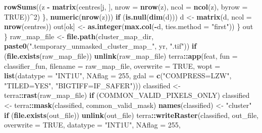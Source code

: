 \documentclass[
]{article}
\newenvironment{Shaded}{\begin{snugshade}}{\end{snugshade}}
\newcommand{\AttributeTok}[1]{\textcolor[rgb]{0.13,0.29,0.53}{#1}}
\newcommand{\ConstantTok}[1]{\textcolor[rgb]{0.56,0.35,0.01}{#1}}
\newcommand{\ControlFlowTok}[1]{\textcolor[rgb]{0.13,0.29,0.53}{\textbf{#1}}}
\newcommand{\DecValTok}[1]{\textcolor[rgb]{0.00,0.00,0.81}{#1}}
\newcommand{\FunctionTok}[1]{\textcolor[rgb]{0.13,0.29,0.53}{\textbf{#1}}}
\newcommand{\NormalTok}[1]{#1}
\newcommand{\OtherTok}[1]{\textcolor[rgb]{0.56,0.35,0.01}{#1}}
\newcommand{\SpecialCharTok}[1]{\textcolor[rgb]{0.81,0.36,0.00}{\textbf{#1}}}
\newcommand{\StringTok}[1]{\textcolor[rgb]{0.31,0.60,0.02}{#1}}
\begin{document}
\begin{Shaded}
\begin{Highlighting}[]
        \FunctionTok{rowSums}\NormalTok{((z }\SpecialCharTok{{-}} \FunctionTok{matrix}\NormalTok{(centres[j, ], }\AttributeTok{nrow =} \FunctionTok{nrow}\NormalTok{(z), }\AttributeTok{ncol =} \FunctionTok{ncol}\NormalTok{(z), }\AttributeTok{byrow =} \ConstantTok{TRUE}\NormalTok{))}\SpecialCharTok{\^{}}\DecValTok{2}\NormalTok{)}
\NormalTok{      \}, }\FunctionTok{numeric}\NormalTok{(}\FunctionTok{nrow}\NormalTok{(z)))}
      \ControlFlowTok{if}\NormalTok{ (}\FunctionTok{is.null}\NormalTok{(}\FunctionTok{dim}\NormalTok{(d))) d }\OtherTok{\textless{}{-}} \FunctionTok{matrix}\NormalTok{(d, }\AttributeTok{ncol =} \FunctionTok{nrow}\NormalTok{(centres))}
\NormalTok{      out[ok] }\OtherTok{\textless{}{-}} \FunctionTok{as.integer}\NormalTok{(}\FunctionTok{max.col}\NormalTok{(}\SpecialCharTok{{-}}\NormalTok{d, }\AttributeTok{ties.method =} \StringTok{"first"}\NormalTok{))}
\NormalTok{    \}}
\NormalTok{    out}
\NormalTok{  \}}
\NormalTok{  raw\_map\_file }\OtherTok{\textless{}{-}} \FunctionTok{file.path}\NormalTok{(cluster\_map\_dir, }\FunctionTok{paste0}\NormalTok{(}\StringTok{".temporary\_unmasked\_cluster\_map\_"}\NormalTok{, yr, }\StringTok{".tif"}\NormalTok{))}
  \ControlFlowTok{if}\NormalTok{ (}\FunctionTok{file.exists}\NormalTok{(raw\_map\_file)) }\FunctionTok{unlink}\NormalTok{(raw\_map\_file)}
\NormalTok{  terra}\SpecialCharTok{::}\FunctionTok{app}\NormalTok{(feat, }\AttributeTok{fun =}\NormalTok{ classifier\_fun, }\AttributeTok{filename =}\NormalTok{ raw\_map\_file, }\AttributeTok{overwrite =} \ConstantTok{TRUE}\NormalTok{,}
             \AttributeTok{wopt =} \FunctionTok{list}\NormalTok{(}\AttributeTok{datatype =} \StringTok{"INT1U"}\NormalTok{, }\AttributeTok{NAflag =} \DecValTok{255}\NormalTok{, }\AttributeTok{gdal =} \FunctionTok{c}\NormalTok{(}\StringTok{"COMPRESS=LZW"}\NormalTok{, }\StringTok{"TILED=YES"}\NormalTok{, }\StringTok{"BIGTIFF=IF\_SAFER"}\NormalTok{)))}
\NormalTok{  classified }\OtherTok{\textless{}{-}}\NormalTok{ terra}\SpecialCharTok{::}\FunctionTok{rast}\NormalTok{(raw\_map\_file)}
  \ControlFlowTok{if}\NormalTok{ (COMMON\_VALID\_PIXELS\_ONLY) classified }\OtherTok{\textless{}{-}}\NormalTok{ terra}\SpecialCharTok{::}\FunctionTok{mask}\NormalTok{(classified, common\_valid\_mask)}
  \FunctionTok{names}\NormalTok{(classified) }\OtherTok{\textless{}{-}} \StringTok{"cluster"}
  \ControlFlowTok{if}\NormalTok{ (}\FunctionTok{file.exists}\NormalTok{(out\_file)) }\FunctionTok{unlink}\NormalTok{(out\_file)}
\NormalTok{  terra}\SpecialCharTok{::}\FunctionTok{writeRaster}\NormalTok{(classified, out\_file, }\AttributeTok{overwrite =} \ConstantTok{TRUE}\NormalTok{, }\AttributeTok{datatype =} \StringTok{"INT1U"}\NormalTok{, }\AttributeTok{NAflag =} \DecValTok{255}\NormalTok{,}

\end{Highlighting}
\end{Shaded}
\end{document}
